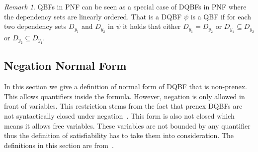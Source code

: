 \documentclass[
  digital, %
  twoside, %
  table,   %
  nolof,     %
  nolot,     %
]{fithesis3}
\theoremstyle{definition}
\theoremstyle{remark}
\newtheorem*{remark}{Remark}
\begin{document}
\begin{remark}
QBFs in PNF can be seen as a special case of DQBFs in PNF where the dependency sets are linearly ordered. That is a DQBF $\psi$ is a QBF if for each two dependency sets $D_{y_1}$ and $D_{y_2}$ in $\psi$ it holds that either $D_{y_1} = D_{y_2}$ or $D_{y_1} \subseteq D_{y_2}$ or $D_{y_2} \subseteq D_{y_1}$.
\end{remark}


\subsection{Negation Normal Form}

In this section we give a definition of normal form of DQBF that is non-prenex. This allows quantifiers inside the formula. However, negation is only allowed in front of variables. This restriction stems from the fact that prenex DQBFs are not syntactically closed under negation~\cite{NegationOfDQBFs}. %
This form is also not closed which means it allows free variables. These variables are not bounded by any quantifier thus the definition of satisfiability has to take them into consideration. The definitions in this section are from~\cite{HQSquantifierLocalization}.
\end{document}
